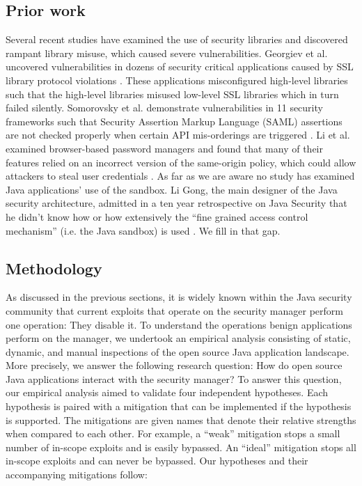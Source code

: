 \documentclass{sig-alternate}
\begin{document}
\subsection{Prior work}

Several recent studies have examined the use of security libraries
and discovered rampant library misuse, which caused severe vulnerabilities.
Georgiev et al. uncovered vulnerabilities in dozens of security critical
applications caused by SSL library protocol violations \cite{georgiev12most-dangerous}.
These applications misconfigured high-level libraries such that the
high-level libraries misused low-level SSL libraries which in turn
failed silently. Somorovsky et al. demonstrate vulnerabilities in
11 security frameworks such that Security Assertion Markup Language
(SAML) assertions are not checked properly when certain API mis-orderings
are triggered \cite{somorovsky12breaking}. Li et al. examined browser-based
password managers and found that many of their features relied on
an incorrect version of the same-origin policy, which could allow
attackers to steal user credentials \cite{li2014emperor}. As far
as we are aware no study has examined Java applications' use of the
sandbox. Li Gong, the main designer of the Java security architecture,
admitted in a ten year retrospective on Java Security that he didn't
know how or how extensively the ``fine grained access control mechanism''
(i.e. the Java sandbox) is used \cite{gong2009java}. We fill in that
gap. 


\subsection{Methodology}

As discussed in the previous sections, it is widely known within the
Java security community that current exploits that operate on the
security manager perform one operation: They disable it. To understand
the operations benign applications perform on the manager, we undertook
an empirical analysis consisting of static, dynamic, and manual inspections
of the open source Java application landscape. More precisely, we
answer the following research question: How do open source Java applications
interact with the security manager? To answer this question, our empirical
analysis aimed to validate four independent hypotheses. Each hypothesis
is paired with a mitigation that can be implemented if the hypothesis
is supported. The mitigations are given names that denote their relative
strengths when compared to each other. For example, a ``weak'' mitigation
stops a small number of in-scope exploits and is easily bypassed.
An ``ideal'' mitigation stops all in-scope exploits and can never
be bypassed. Our hypotheses and their accompanying mitigations follow: 
\end{document}
